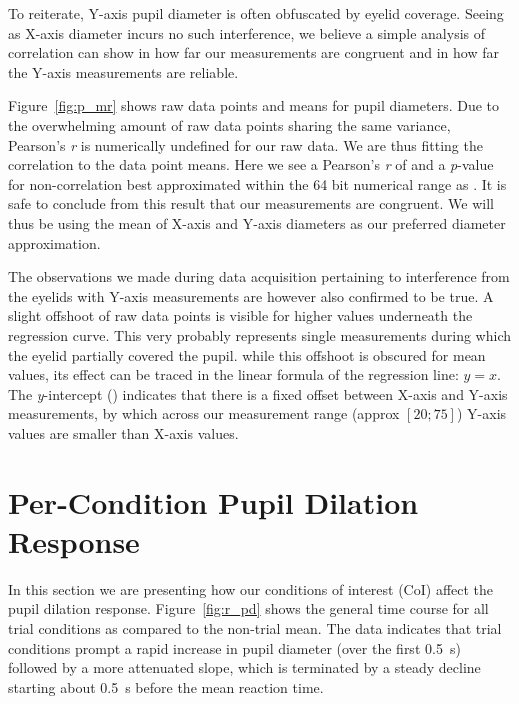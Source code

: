 	To reiterate, Y-axis pupil diameter is often obfuscated by eyelid coverage.
	Seeing as X-axis diameter incurs no such interference, we believe a simple analysis of correlation can show in how far our measurements are congruent and in how far the Y-axis measurements are reliable.
	
	Figure~\ref{fig:p_mr} shows raw data points and means for pupil diameters.
	Due to the overwhelming amount of raw data points sharing the same variance, Pearson's \textit{r} is numerically undefined for our raw data.
	We are thus fitting the correlation to the data point means. 
	Here we see a Pearson's \textit{r} of  and a \textit{p}-value for non-correlation best approximated within the 64 bit numerical range as  .
	It is safe to conclude from this result that our measurements are congruent.
	We will thus be using the mean of X-axis and Y-axis diameters as our preferred diameter approximation.
	
	The observations we made during data acquisition pertaining to interference from the eyelids with Y-axis measurements are however also confirmed to be true.
	A slight offshoot of raw data points is visible for higher values underneath the regression curve.
	This very probably represents single measurements during which the eyelid partially covered the pupil.  
	while this offshoot is obscured for mean values, its effect can be traced in the linear formula of the regression line: 
	$y = $$x$.
	The \textit{y}-intercept () indicates that there is a fixed offset between X-axis and Y-axis measurements, by which across our measurement range (approx $[20;75]$) Y-axis values are smaller than X-axis values.
    \section{Per-Condition Pupil Dilation Response}\label{sec:r_pd}
	In this section we are presenting how our conditions of interest (CoI) affect the pupil dilation response.
	Figure~\ref{fig:r_pd} shows the general time course for all trial conditions as compared to the non-trial mean.
	The data indicates that trial conditions prompt a rapid increase in pupil diameter (over the first \SI{0.5}{\second}) followed by a more attenuated slope, which is terminated by a steady decline starting about \SI{0.5}{\second} before the mean reaction time.
	
